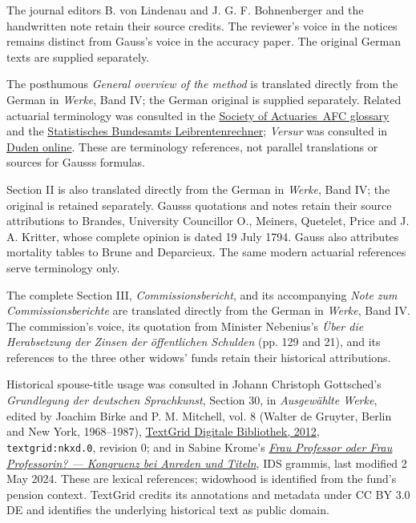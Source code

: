 The journal editors B. von Lindenau and J. G. F. Bohnenberger and the handwritten note retain their source credits. The reviewer’s voice in the notices remains distinct from Gauss’s voice in the accuracy paper. The original German texts are supplied separately.\par\medskip\noindent The posthumous \textit{General overview of the method} is translated directly from the German in \textit{Werke}, Band IV; the German original is supplied separately. Related actuarial terminology was consulted in the \href{https://afc.soa.org/}{Society of Actuaries\textquotesingle\ AFC glossary} and the \href{https://service.destatis.de/DE/leibrentenrechner/}{Statistisches Bundesamt\textquotesingle s Leibrentenrechner}; \textit{Versur} was consulted in \href{https://www.duden.de/rechtschreibung/Versur}{Duden online}. These are terminology references, not parallel translations or sources for Gauss\textquotesingle s formulas.\par\medskip\noindent Section II is also translated directly from the German in \textit{Werke}, Band IV; the original is retained separately. Gauss\textquotesingle s quotations and notes retain their source attributions to Brandes, University Councillor O., Meiners, Quetelet, Price and J. A. Kritter, whose complete opinion is dated 19 July 1794. Gauss also attributes mortality tables to Brune and Deparcieux. The same modern actuarial references serve terminology only.
\par\medskip\noindent The complete Section III, \textit{Commissionsbericht}, and its accompanying \textit{Note zum Commissionsberichte} are translated directly from the German in \textit{Werke}, Band IV. The commission's voice, its quotation from Minister Nebenius's \textit{Über die Herabsetzung der Zinsen der öffentlichen Schulden} (pp. 129 and 21), and its references to the three other widows' funds retain their historical attributions.\par\medskip\noindent Historical spouse-title usage was consulted in Johann Christoph Gottsched's \textit{Grundlegung der deutschen Sprachkunst}, Section 30, in \textit{Ausgewählte Werke}, edited by Joachim Birke and P. M. Mitchell, vol. 8 (Walter de Gruyter, Berlin and New York, 1968--1987), \href{https://www.textgridrep.org/browse/nkxb.0}{TextGrid Digitale Bibliothek, 2012}, \texttt{textgrid:nkxd.0}, revision 0; and in Sabine Krome's \href{https://grammis.ids-mannheim.de/fragen/3050}{\textit{Frau Professor oder Frau Professorin? --- Kongruenz bei Anreden und Titeln}}, IDS grammis, last modified 2 May 2024. These are lexical references; widowhood is identified from the fund's pension context. TextGrid credits its annotations and metadata under CC BY 3.0 DE and identifies the underlying historical text as public domain.
